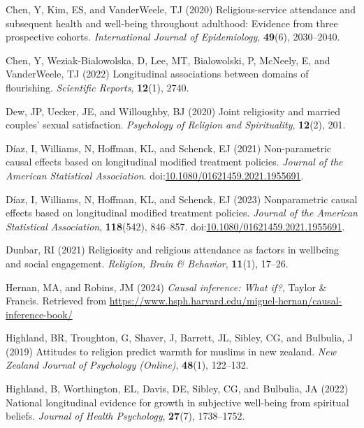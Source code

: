 \documentclass[
  single column]{article}
\newlength{\cslhangindent}
\newenvironment{CSLReferences}[2] %
 {\begin{list}{}{%
  \setlength{\itemindent}{0pt}
  \setlength{\leftmargin}{0pt}
  \setlength{\parsep}{0pt}
  \ifodd #1
   \setlength{\leftmargin}{\cslhangindent}
   \setlength{\itemindent}{-1\cslhangindent}
  \fi
  \setlength{\itemsep}{#2\baselineskip}}}
 {\end{list}}
\begin{document}
\begin{CSLReferences}{1}{0}
Chen, Y, Kim, ES, and VanderWeele, TJ (2020) Religious-service
attendance and subsequent health and well-being throughout adulthood:
Evidence from three prospective cohorts. \emph{International Journal of
Epidemiology}, \textbf{49}(6), 2030--2040.

Chen, Y, Weziak-Bialowolska, D, Lee, MT, Bialowolski, P, McNeely, E, and
VanderWeele, TJ (2022) Longitudinal associations between domains of
flourishing. \emph{Scientific Reports}, \textbf{12}(1), 2740.

Dew, JP, Uecker, JE, and Willoughby, BJ (2020) Joint religiosity and
married couples' sexual satisfaction. \emph{Psychology of Religion and
Spirituality}, \textbf{12}(2), 201.

Díaz, I, Williams, N, Hoffman, KL, and Schenck, EJ (2021) Non-parametric
causal effects based on longitudinal modified treatment policies.
\emph{Journal of the American Statistical Association}.
doi:\href{https://doi.org/10.1080/01621459.2021.1955691}{10.1080/01621459.2021.1955691}.

Díaz, I, Williams, N, Hoffman, KL, and Schenck, EJ (2023) Nonparametric
causal effects based on longitudinal modified treatment policies.
\emph{Journal of the American Statistical Association},
\textbf{118}(542), 846--857.
doi:\href{https://doi.org/10.1080/01621459.2021.1955691}{10.1080/01621459.2021.1955691}.

Dunbar, RI (2021) Religiosity and religious attendance as factors in
wellbeing and social engagement. \emph{Religion, Brain \& Behavior},
\textbf{11}(1), 17--26.

Hernan, MA, and Robins, JM (2024) \emph{Causal inference: What if?},
Taylor \& Francis. Retrieved from
\url{https://www.hsph.harvard.edu/miguel-hernan/causal-inference-book/}

Highland, BR, Troughton, G, Shaver, J, Barrett, JL, Sibley, CG, and
Bulbulia, J (2019) Attitudes to religion predict warmth for muslims in
new zealand. \emph{New Zealand Journal of Psychology (Online)},
\textbf{48}(1), 122--132.

Highland, B, Worthington, EL, Davis, DE, Sibley, CG, and Bulbulia, JA
(2022) National longitudinal evidence for growth in subjective
well-being from spiritual beliefs. \emph{Journal of Health Psychology},
\textbf{27}(7), 1738--1752.


\end{CSLReferences}
\end{document}
